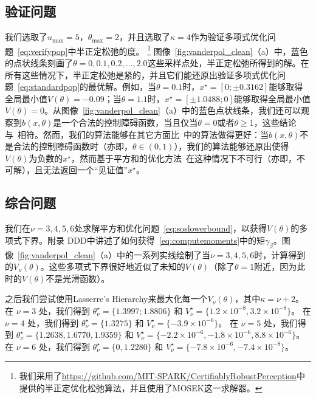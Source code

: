 \subsection{验证问题}
我们选取了$u_{\max} = 5$，$\theta_{\max} = 2$，并且选取了$\kappa = 4$作为验证多项式优化问题~\eqref{eq:verifypop}中半正定松弛的度。
\footnote{
    我们采用了\url{https://github.com/MIT-SPARK/CertifiablyRobustPerception}中提供的半正定优化松弛算法，并且使用了MOSEK这一求解器。
}
图像~\ref{fig:vanderpol_clean}（a）中，蓝色的点状线条刻画了$\theta = 0, 0.1, 0.2, \dots, 2.0$这些采样点处，半正定松弛所得到的解。在所有这些情况下，半正定松弛是紧的，并且它们能还原出验证多项式优化问题~\eqref{eq:standardpop}的最优解。例如，当$\theta = 0.1$时，$x^\star = [0; \pm 0.3162]$能够取得全局最小值$V(\theta) = -0.09$；当$\theta = 1.1$时，$x^\star = [\pm 1.0488; 0]$能够取得全局最小值$V(\theta) = 0$。从图像~\ref{fig:vanderpol_clean}（a）中的蓝色点状线条，我们还可以观察到$b(x, \theta)$是一个合法的控制障碍函数，当且仅当$\theta = 0$或者$\theta \ge 1$，这些结论与~\cite{clark22arxiv-cbf}相符。然而，我们的算法能够在其它方面比~\cite{clark22arxiv-cbf}中的算法做得更好：当$b(x, \theta)$不是合法的控制障碍函数时（亦即，$\theta \in (0, 1)$），我们的算法能够还原出使得$V(\theta)$为负数的$x^\star$，然而基于平方和的优化方法~\cite{clark22arxiv-cbf}在这种情况下不可行（亦即，不可解），且无法返回一个“见证值”$x^\star$。



\subsection{综合问题}
我们在$\nu = 3, 4, 5, 6$处求解平方和优化问题~\eqref{eq:soslowerbound}，以获得$V(\theta)$的多项式下界。附录{\color{red} DDD}中讲述了如何获得~\eqref{eq:computemoments}中的矩$\gamma_\beta$。图像~\ref{fig:vanderpol_clean}（a）中的一系列实线绘制了当$\nu = 3, 4, 5, 6$时，计算得到的$V_\nu(\theta)$。这些多项式下界很好地近似了未知的$V(\theta)$（除了$\theta = 1$附近，因为此时的$V(\theta)$不是光滑函数）。

之后我们尝试使用Lasserre's Hierarchy来最大化每一个$V_\nu(\theta)$，其中$\kappa = \nu + 2$。在 $\nu=3$ 处，我们得到 $\theta_\nu^\star = \{ 1.3997;1.8806 \}$ 和 $V_\nu^\star = \{1.2\times 10^{-8},3.2 \times 10^{-8} \}$。 在 $\nu=4$ 处，我们得到 $\theta_\nu^\star = \{ 1.3275 \}$ 和 $V_\nu^\star = \{-3.9\times 10^{-6} \}$。 在 $\nu=5$ 处，我们得到 $\theta_\nu^\star = \{ 1.2638, 1.6770, 1.9359 \}$ 和 $V_\nu^\star = \{-2.2\times 10^{-6} , -1.8 \times 10^{-6}, 8.8 \times 10^{-6} \}$。 在 $\nu=6$ 处，我们得到 $\theta_\nu^\star = \{ 0,1.2280 \}$ 和 $V_\nu^\star = \{-7.8\times 10^{-6}, - 7.4\times 10^{-8}\}$。

